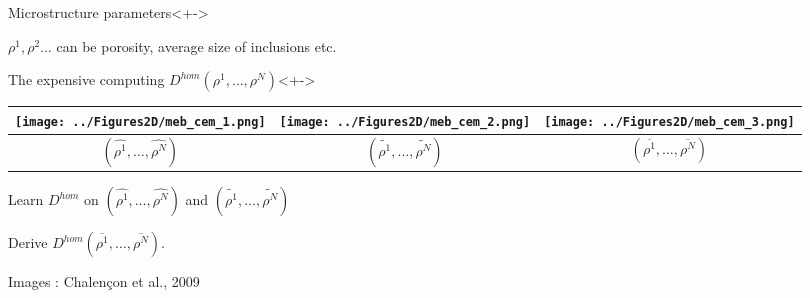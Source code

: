 \begin{frame}%
%
\begin{block}{Microstructure parameters}<+->
%
\begin{multicols}{3}
$\rho^1, \rho^2 \dots$ can be porosity, average size of inclusions etc.

\columnbreak

{}

\columnbreak

{}
\end{multicols}
%
%
\end{block}
%
\begin{block}{The expensive computing $D^{hom}(\rho^1,\dots ,\rho^N)$}<+->
%
\begin{tabular}{|c|c|c|}
\hline
\texttt{[image: ../Figures2D/meb\_cem\_1.png]}&%
\texttt{[image: ../Figures2D/meb\_cem\_2.png]}&%
\texttt{[image: ../Figures2D/meb\_cem\_3.png]}%
\\
\hline
$(\hat{\rho^1},\dots ,\hat{\rho^N})$&%
$(\tilde{\rho^1},\dots ,\tilde{\rho^N})$&%
$(\overline{\rho^1},\dots ,\overline{\rho^N})$%
\\
\hline
\end{tabular}

\begin{description}
\item<+-> [Training] Learn $D^{hom}$ on $(\hat{\rho^1},\dots ,\hat{\rho^N})$ and $(\tilde{\rho^1},\dots ,\tilde{\rho^N})$
\item<+-> [ROM] Derive $D^{hom}(\overline{\rho^1},\dots ,\overline{\rho^N})$.
\end{description}
%
\par
Images : Chalen\c con et al., 2009
\end{block}
%
\end{frame}